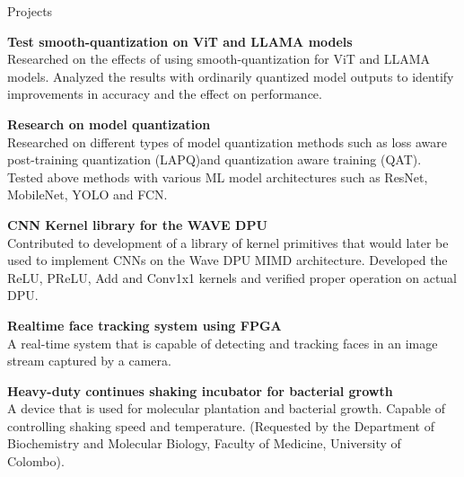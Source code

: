 \documentclass[
	11pt, %
]{./assets/resume} %
\begin{document}
\begin{rSection}{Projects}

	\textbf{Test smooth-quantization on ViT and LLAMA models} \\
	Researched on the effects of using smooth-quantization for ViT and LLAMA models. Analyzed the results with ordinarily quantized model outputs to identify improvements in accuracy and the effect on performance.

	\textbf{Research on model quantization} \\
	Researched on different types of model quantization methods such as loss aware post-training quantization (LAPQ)and quantization aware training (QAT). Tested above methods with various ML model architectures such as ResNet, MobileNet, YOLO and FCN.

	\textbf{CNN Kernel library for the WAVE DPU} \\
	Contributed to development of a library of kernel primitives that would later be used to implement CNNs on the Wave DPU MIMD architecture. Developed the ReLU, PReLU, Add and Conv1x1 kernels and verified proper operation on actual DPU.

	\textbf{Realtime face tracking system using FPGA} \\
	A real-time system that is capable of detecting and tracking faces in an image stream captured by a camera.

	\textbf{Heavy-duty continues shaking incubator for bacterial growth} \\
	A device that is used for molecular plantation and bacterial growth. Capable of controlling shaking speed and temperature. (Requested by the Department of Biochemistry and Molecular Biology, Faculty of Medicine, University of Colombo).

\end{rSection}





\end{document}

